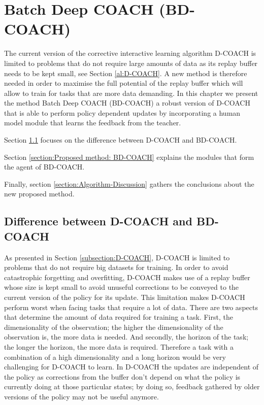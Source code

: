 \chapter{Batch Deep COACH (BD-COACH)}
\label{chapter:Proposed Method}



The current version of the corrective interactive learning algorithm D-COACH is limited to problems that do not require large amounts of data as its replay buffer needs to be kept small, see Section \ref{al:D-COACH}. A new method is therefore needed in order to maximise the full potential of the replay buffer which will allow to train for tasks that are more data demanding. In this chapter we present the method Batch Deep COACH (BD-COACH) a robust version of D-COACH that is able to perform policy dependent updates by incorporating a  human model module that learns the feedback from the teacher.

Section \ref{section:Difference between D-COACH and BD-COACH} focuses on the difference between D-COACH and BD-COACH.

Section \ref{section:Proposed method: BD-COACH} explains the modules that form the agent of BD-COACH.


Finally, section \ref{section:Algorithm-Discussion} gathers the conclusions about the new proposed method.  


\section{Difference between D-COACH and BD-COACH}
\label{section:Difference between D-COACH and BD-COACH}

As presented in Section \ref{subsection:D-COACH}, D-COACH is limited to problems that do not require big datasets for training. In order to avoid catastrophic forgetting and overfitting, D-COACH makes use of a replay buffer whose size is kept small to avoid unuseful corrections to be conveyed to the current version of the policy for its update. This limitation makes  D-COACH perform worst when facing tasks that require a lot of data. There are two aspects that determine the amount of data required for training a task. First, the dimensionality of the observation;  the higher the dimensionality of the observation is, the more data is needed. And secondly, the horizon of the task; the longer the horizon, the more data is required. Therefore a task with a combination of a high dimensionality and a long horizon would be very challenging for D-COACH to learn. In D-COACH the updates are independent of the policy as corrections from the buffer don't depend on what the policy is currently doing at those particular states; by doing so, feedback gathered by older versions of the policy may not be useful anymore.


